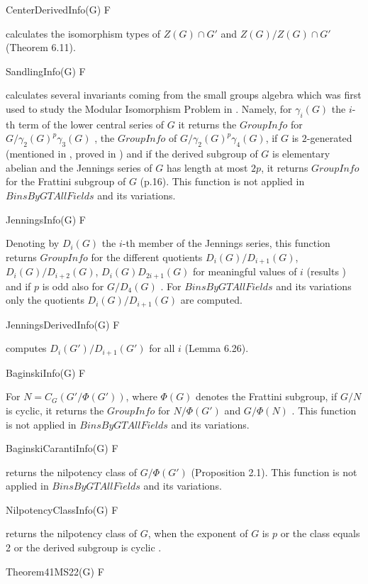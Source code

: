 \> CenterDerivedInfo(G) F

calculates the isomorphism types of $Z(G) \cap G'$ and $Z(G)/ Z(G) \cap G'$ 
\cite{San85}(Theorem 6.11).

\> SandlingInfo(G) F

calculates several invariants coming from the small groups algebra which was first
used to study the Modular Isomorphism Problem in \cite{San89}. Namely, for $\gamma_i(G)$
the $i$-th term of the lower central series of $G$ it returns the $GroupInfo$ for
$G/\gamma_2(G)^p\gamma_3(G)$ \cite{San89}, the $GroupInfo$ of $G/\gamma_2(G)^p\gamma_4(G)$,
if $G$ is $2$-generated (mentioned in \cite{Bag99}, proved in \cite{MM22}) and if the
derived subgroup of $G$ is elementary abelian and the Jennings series of $G$ has length
at most $2p$, it returns $GroupInfo$ for the Frattini subgroup of $G$ \cite{HS06}(p.16).
This function is not applied in $BinsByGTAllFields$ and its variations.

\> JenningsInfo(G) F

Denoting by $D_i(G)$ the $i$-th member of the Jennings series, this function returns   
$GroupInfo$ for the different quotients $D_i(G)/D_{i+1}(G)$, $D_i(G)/D_{i+2}(G)$, $D_i(G)D_{2i+1}(G)$
for meaningful values of $i$ (results \cite{Jen41} \cite{PS72} \cite{RS83}) and if $p$ is odd also for
$G/D_4(G)$ \cite{Her07}. For $BinsByGTAllFields$ and its variations only the quotients
$D_i(G)/D_{i+1}(G)$ are computed.

\> JenningsDerivedInfo(G) F

computes $D_i(G')/D_{i+1}(G')$ for all $i$ \cite{San85}(Lemma 6.26).

\> BaginskiInfo(G) F

For $N = C_G(G'/\Phi(G'))$, where $\Phi(G)$ denotes the Frattini subgroup, if $G/N$ is
cyclic, it returns the $GroupInfo$ for $N/\Phi(G')$ and $G/\Phi(N)$ \cite{Bag99}.
This function is not applied in $BinsByGTAllFields$ and its variations.

\> BaginskiCarantiInfo(G) F

returns the nilpotency class of $G/\Phi(G')$ \cite{BC88}(Proposition 2.1). 
This function is not applied in $BinsByGTAllFields$ and its variations.

\> NilpotencyClassInfo(G) F

returns the nilpotency class of $G$, when the exponent of $G$ is $p$ or the class equals 2
or the derived subgroup is cyclic \cite{BK07}.

\> Theorem41MS22(G) F

